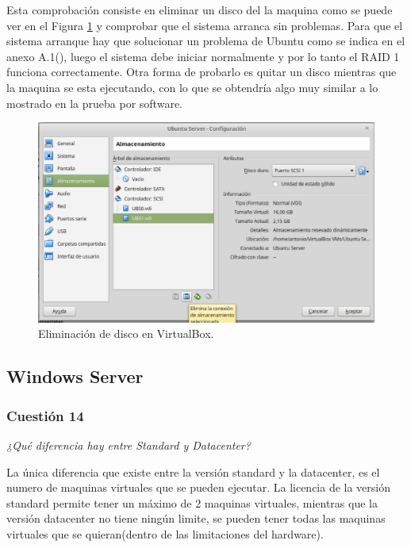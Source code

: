 \begin{description}
 Esta comprobación consiste en eliminar un disco del la maquina como se puede ver en el Figura \ref{fig9} y comprobar que el sistema arranca sin problemas. Para que el sistema arranque hay que solucionar un problema de Ubuntu como se indica en el anexo A.1(), luego el sistema debe iniciar normalmente y por lo tanto el RAID 1 funciona correctamente. Otra forma de probarlo es quitar un disco mientras que la maquina se esta ejecutando, con lo que se obtendría algo muy similar a lo mostrado en la prueba por software.
            \begin{figure}[H]
                \begin{center}
                    \includegraphics[scale=0.4]{Imagenes/eliminar_disco.eps}
                    \caption{Eliminación de disco en VirtualBox.}
                    \label{fig9}
                \end{center}
            \end{figure}
\end{description}


\subsection{Windows Server}
\subsubsection{Cuestión 14}
\textit{¿Qué diferencia hay entre Standard y Datacenter?}\newline

La única diferencia que existe entre la versión standard y la datacenter, es el numero de maquinas virtuales que se pueden ejecutar. La licencia de la versión standard permite tener un máximo de 2 maquinas virtuales, mientras que la versión datacenter no tiene ningún limite, se pueden tener todas las maquinas virtuales que se quieran(dentro de las limitaciones del hardware). \cite{difsd}

